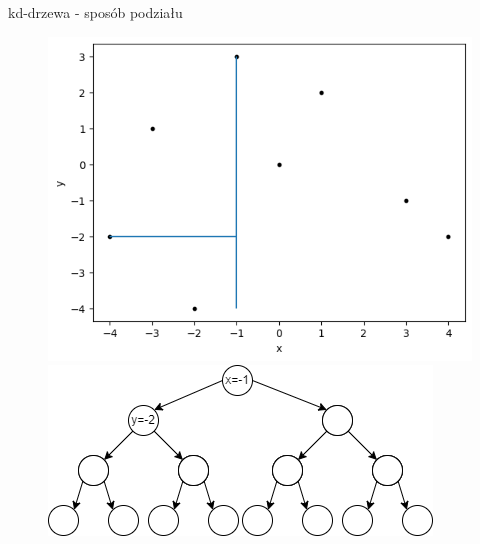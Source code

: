 \documentclass[aspectratio=169,dvipsnames]{beamer}
\begin{document}
\begin{frame}{kd-drzewa - sposób podziału}
    \begin{figure}[H]
        \centering
          \begin{minipage}{0.5\textwidth}
            \centering
            \includegraphics[width=\linewidth]{images/plots/3.png}
          \end{minipage}%
          \begin{minipage}{0.5\textwidth}
            \centering
            \includegraphics[width=\linewidth]{images/trees/3.drawio.png}
          \end{minipage}
    \end{figure}
\end{frame}
\end{document}

